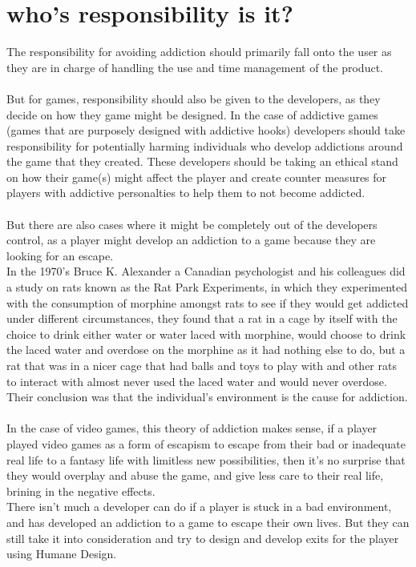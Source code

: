 \documentclass{scrartcl}
\begin{document}
\section{who's responsibility is it?}
The responsibility for avoiding addiction should primarily fall onto the user as they are in charge of handling the use and time management of the product.
\\
\\
But for games, responsibility should also be given to the developers, as they decide on how they game might be designed. In the case of addictive games (games that are purposely designed with addictive hooks) developers should take responsibility for potentially harming individuals who develop addictions around the game that they created. These developers should be taking an ethical stand on how their game(s) might affect the player and create counter measures for players with addictive personalties to help them to not become addicted.
\\
\\
But there are also cases where it might be completely out of the developers control, as a player might develop an addiction to a game because they are looking for an escape.
\\
In the 1970's Bruce K. Alexander a Canadian psychologist and his colleagues did a study on rats known as the Rat Park Experiments, in which they experimented with the consumption of morphine amongst rats to see if they would get addicted under different circumstances, they found that a rat in a cage by itself with the choice to drink either water or water laced with morphine, would choose to drink the laced water and overdose on the morphine as it had nothing else to do, but a rat that was in a nicer cage that had balls and toys to play with and other rats to interact with almost never used the laced water and would never overdose.\cite{RatPark1, RatPark2}
\\
Their conclusion was that the individual's environment is the cause for addiction.
\\
\\
In the case of video games, this theory of addiction makes sense, if a player played video games as a form of escapism to escape from their bad or inadequate real life to a fantasy life with limitless new possibilities, then it's no surprise that they would overplay and abuse the game, and give less care to their real life, brining in the negative effects.
\\
There isn't much a developer can do if a player is stuck in a bad environment, and has developed an addiction to a game to escape their own lives.
But they can still take it into consideration and try to design and develop exits for the player using Humane Design.
\end{document}
